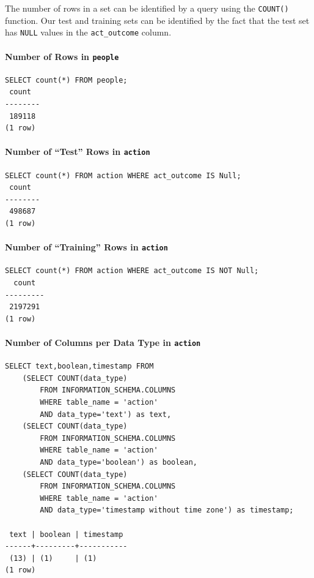 \documentclass[]{report}
\begin{document}
The number of rows in a set can be identified by a query using the
\texttt{COUNT()} function. Our test and training sets can be identified
by the fact that the test set has \texttt{NULL} values in the
\texttt{act\_outcome} column.

\paragraph{Number of Rows in
\texttt{people}}\label{number-of-rows-in-people}

\begin{verbatim}
SELECT count(*) FROM people;
 count
--------
 189118
(1 row)
\end{verbatim}

\paragraph{Number of ``Test'' Rows in
\texttt{action}}\label{number-of-test-rows-in-action}

\begin{verbatim}
SELECT count(*) FROM action WHERE act_outcome IS Null;
 count
--------
 498687
(1 row)
\end{verbatim}

\paragraph{Number of ``Training'' Rows in
\texttt{action}}\label{number-of-training-rows-in-action}

\begin{verbatim}
SELECT count(*) FROM action WHERE act_outcome IS NOT Null;
  count
---------
 2197291
(1 row)
\end{verbatim}

\pagebreak

\paragraph{Number of Columns per Data Type in
\texttt{action}}\label{number-of-columns-per-data-type-in-action}

\begin{verbatim}
SELECT text,boolean,timestamp FROM
    (SELECT COUNT(data_type)
        FROM INFORMATION_SCHEMA.COLUMNS
        WHERE table_name = 'action' 
        AND data_type='text') as text,
    (SELECT COUNT(data_type)
        FROM INFORMATION_SCHEMA.COLUMNS
        WHERE table_name = 'action' 
        AND data_type='boolean') as boolean,
    (SELECT COUNT(data_type)
        FROM INFORMATION_SCHEMA.COLUMNS
        WHERE table_name = 'action' 
        AND data_type='timestamp without time zone') as timestamp;

 text | boolean | timestamp
------+---------+-----------
 (13) | (1)     | (1)
(1 row)
\end{verbatim}
\end{document}
